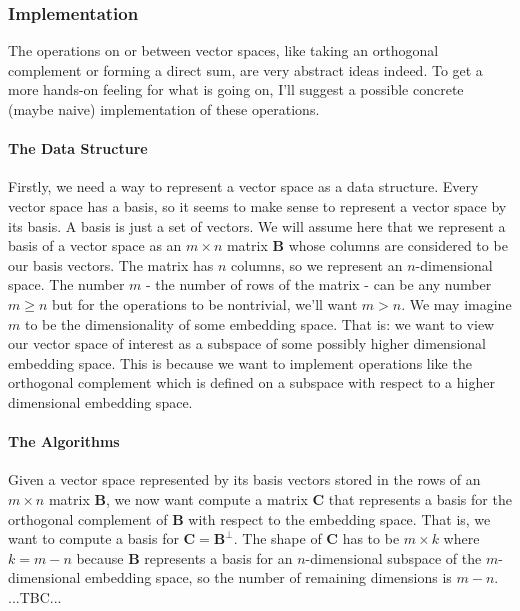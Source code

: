 


\subsubsection{Implementation}
The operations on or between vector spaces, like taking an orthogonal complement or forming a direct sum, are very abstract ideas indeed. To get a more hands-on feeling for what is going on, I'll suggest a possible concrete (maybe naive) implementation of these operations. 

\paragraph{The Data Structure}
Firstly, we need a way to represent a vector space as a data structure. Every vector space has a basis, so it seems to make sense to represent a vector space by its basis. A basis is just a set of vectors. We will assume here that we represent a basis of a vector space as an $m \times n$ matrix $\mathbf{B}$ whose columns are considered to be our basis vectors. The matrix has $n$ columns, so we represent an $n$-dimensional space. The number $m$ - the number of rows of the matrix - can be any number $m \geq n$ but for the operations to be nontrivial, we'll want $m > n$. We may imagine $m$ to be the dimensionality of some embedding space. That is: we want to view our vector space of interest as a subspace of some possibly higher dimensional embedding space. This is because we want to implement operations like the orthogonal complement which is defined on a subspace with respect to a higher dimensional embedding space. 


\paragraph{The Algorithms}
Given a vector space represented by its basis vectors stored in the rows of an $m \times n$ matrix $\mathbf{B}$, we now want compute a matrix $\mathbf{C}$ that represents a basis for the orthogonal complement of $\mathbf{B}$ with respect to the embedding space. That is, we want to compute a basis for $\mathbf{C} = \mathbf{B}^\perp$. The shape of $\mathbf{C}$ has to be $m \times k$ where $k = m - n$ because $\mathbf{B}$ represents a basis for an $n$-dimensional subspace of the $m$-dimensional embedding space, so the number of remaining dimensions is $m-n$. ...TBC...

